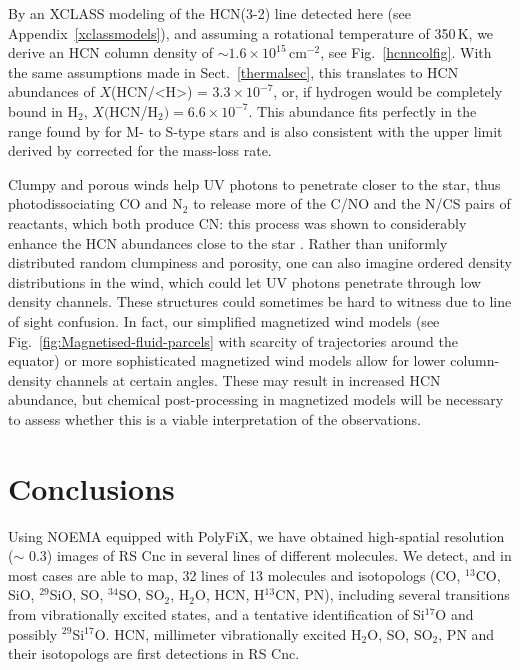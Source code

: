 \documentclass{aa}
\begin{document}
By an XCLASS modeling of the HCN(3-2) line detected here (see
Appendix~\ref{xclassmodels}), and assuming a rotational temperature of
350\,K, we derive an HCN column density of $\sim1.6 \times
10^{15}$\,cm$^{-2}$, see Fig.~\ref{hcnncolfig}. With the same
assumptions made in Sect.~\ref{thermalsec}, this translates to HCN
abundances of $X$(HCN/<H>) = $3.3\times10^{-7}$, or, if hydrogen would
be completely bound in H$_2$, $X($HCN/H$_2) = 6.6\times10^{-7}$.  This
abundance fits perfectly in the range found by \citet{sroetal2013} for
M- to S-type stars and is also consistent with the upper limit derived
by \citet{bfo94} corrected for the mass-loss rate.

Clumpy and porous winds help UV photons to penetrate closer to the
star, thus photodissociating CO and N$_{2}$ to release more of the
C/NO and the N/CS pairs of reactants, which both produce CN: this
process was shown to considerably enhance the HCN abundances close to
the star \citep{vandesandeetal2018,vandesandeetal2020}. Rather than
uniformly distributed random clumpiness and porosity, one can also
imagine ordered density distributions in the wind, which could let UV
photons  penetrate through low density channels. These structures
could sometimes  be hard to witness due to line of sight confusion. In
fact, our simplified magnetized wind models (see
Fig.~\ref{fig:Magnetised-fluid-parcels} with scarcity of trajectories
around the equator) or more sophisticated magnetized wind models
\citep[e.g.][]{mbwg2000,1993MNRAS.262..936W} allow for lower
column-density channels at certain angles. These may result in
increased HCN abundance, but chemical post-processing in magnetized
models will be necessary to assess whether this is a viable
interpretation of the observations.

\section{Conclusions}\label{conclusec}

Using NOEMA equipped with PolyFiX, we have obtained high-spatial
resolution ($\sim$ 0.3\arcsec) images of RS Cnc in several lines of
different molecules.  We detect, and in most cases are able to map, 32
lines of 13 molecules and isotopologs (CO, $^{13}$CO, SiO,
$^{29}$SiO, SO, $^{34}$SO, SO$_2$, H$_2$O, HCN,  H$^{13}$CN, PN),
including several transitions from vibrationally excited states, and a
tentative identification of Si$^{17}$O and possibly $^{29}$Si$^{17}$O.
HCN, millimeter vibrationally excited H$_2$O, SO, SO$_2$, PN and their
isotopologs are first detections in RS Cnc.
 
\end{document}
